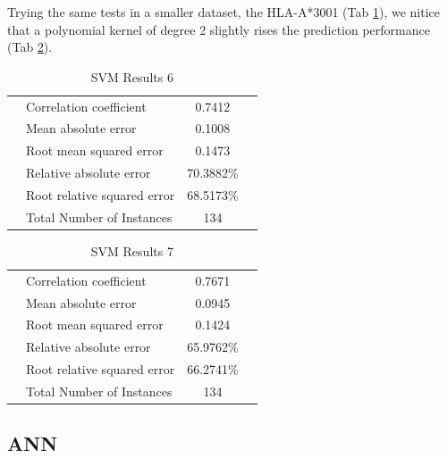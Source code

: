 Trying the same tests in a smaller dataset, the HLA-A*3001 (Tab \ref{tab:svm6}), we nitice that a polynomial kernel of degree 2 slightly rises the prediction performance (Tab \ref{tab:svm7}).

\begin{table}[ht]
\begin{center}
\begin{tabular}{ ll c r }
\hline
 & Correlation coefficient       &           0.7412 \\
 & Mean absolute error            &          0.1008 \\
 & Root mean squared error        &          0.1473 \\
 & Relative absolute error        &         70.3882\% \\
 & Root relative squared error    &         68.5173\% \\
 & Total Number of Instances      &        134 \\
\hline
\end{tabular}
\label{tab:svm6}
\caption{SVM Results 6}
\end{center}
\end{table}


\begin{table}[ht]
\begin{center}
\begin{tabular}{ ll c r }
\hline
 & Correlation coefficient        &          0.7671 \\
 & Mean absolute error            &          0.0945 \\
 & Root mean squared error        &          0.1424 \\
 & Relative absolute error        &         65.9762\% \\
 & Root relative squared error    &         66.2741\% \\
 & Total Number of Instances      &        134 \\
\hline
\end{tabular}
\label{tab:svm7}
\caption{SVM Results 7}
\end{center}
\end{table}

\subsection*{ANN}

